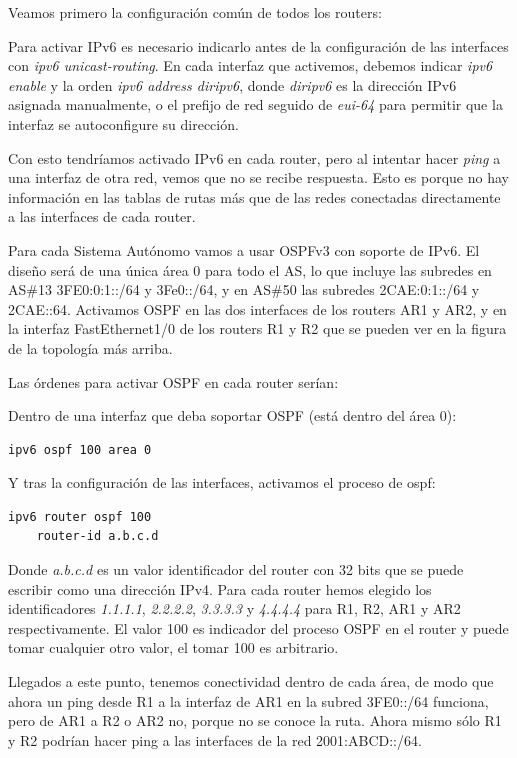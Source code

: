 \documentclass{article}
\begin{document}
Veamos primero la configuración común de todos los routers:

Para activar IPv6 es necesario indicarlo antes de la configuración de las interfaces con \textit{ipv6 unicast-routing}. En cada interfaz que activemos, debemos indicar \textit{ipv6 enable} y la orden \textit{ipv6 address diripv6}, donde \textit{diripv6} es la dirección IPv6 asignada manualmente, o el prefijo de red seguido de \textit{eui-64} para permitir que la interfaz se autoconfigure su dirección.

Con esto tendríamos activado IPv6 en cada router, pero al intentar hacer \textit{ping} a una interfaz de otra red, vemos que no se recibe respuesta. Esto es porque no hay información en las tablas de rutas más que de las redes conectadas directamente a las interfaces de cada router.

Para cada Sistema Autónomo vamos a usar OSPFv3 con soporte de IPv6. El diseño será de una única área 0 para todo el AS, lo que incluye las subredes en AS\#13 3FE0:0:1::/64 y 3Fe0::/64, y en AS\#50 las subredes 2CAE:0:1::/64 y 2CAE::64. Activamos OSPF en las dos interfaces de los routers AR1 y AR2, y en la interfaz FastEthernet1/0 de los routers R1 y R2 que se pueden ver en la figura de la topología más arriba.

Las órdenes para activar OSPF en cada router serían:

Dentro de una interfaz que deba soportar OSPF (está dentro del área 0):

\begin{BVerbatim}
ipv6 ospf 100 area 0
\end{BVerbatim}

Y tras la configuración de las interfaces, activamos el proceso de ospf:

\begin{BVerbatim}
ipv6 router ospf 100
	router-id a.b.c.d
\end{BVerbatim}

Donde \textit{a.b.c.d} es un valor identificador del router con 32 bits que se puede escribir como una dirección IPv4. Para cada router hemos elegido los identificadores \textit{1.1.1.1}, \textit{2.2.2.2}, \textit{3.3.3.3} y \textit{4.4.4.4} para R1, R2, AR1 y AR2 respectivamente. El valor 100 es indicador del proceso OSPF en el router y puede tomar cualquier otro valor, el tomar 100 es arbitrario.

Llegados a este punto, tenemos conectividad dentro de cada área, de modo que ahora un ping desde R1 a la interfaz de AR1 en la subred 3FE0::/64 funciona, pero de AR1 a R2 o AR2 no, porque no se conoce la ruta. Ahora mismo sólo R1 y R2 podrían hacer ping a las interfaces de la red 2001:ABCD::/64.
\end{document}
